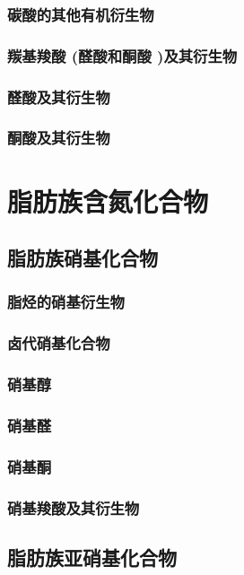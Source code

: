\documentclass[UTF8]{../03-Chemistry}
\begin{document}
        \subsubsection{碳酸的其他有机衍生物}
    \subsubsection{羰基羧酸 (醛酸和酮酸 )及其衍生物}
        \subsubsection{醛酸及其衍生物}
        \subsubsection{酮酸及其衍生物}

\section{脂肪族含氮化合物}
    \subsection{脂肪族硝基化合物}
        \subsubsection{脂烃的硝基衍生物}
        \subsubsection{卤代硝基化合物}
        \subsubsection{硝基醇}
        \subsubsection{硝基醛}
        \subsubsection{硝基酮}
        \subsubsection{硝基羧酸及其衍生物}
    \subsection{脂肪族亚硝基化合物}
\end{document}
